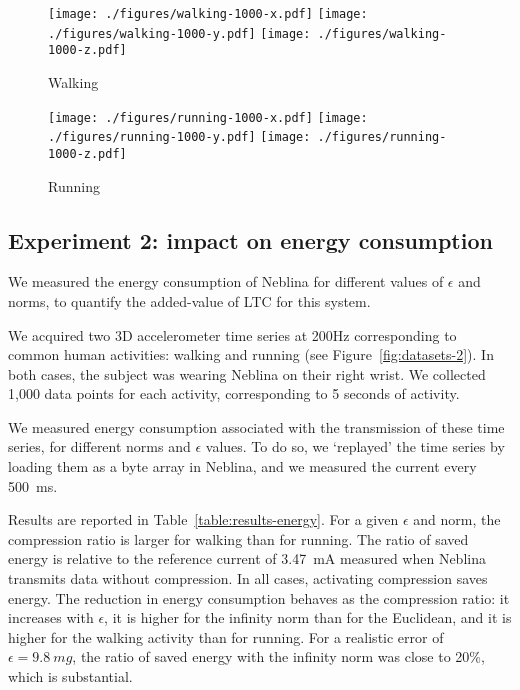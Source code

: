 \documentclass[10pt, conference, compsocconf]{IEEEtran}
\newcommand{\todo}[1]{\marginpar{\parbox{18mm}{\flushleft\tiny\color{red}\textbf{TODO}:
      #1}}}
\begin{document}
\begin{figure*}
\begin{subfigure}{2\columnwidth}
\texttt{[image: ./figures/walking-1000-x.pdf]}
\texttt{[image: ./figures/walking-1000-y.pdf]}
\texttt{[image: ./figures/walking-1000-z.pdf]}
\caption{Walking}
\end{subfigure}
\begin{subfigure}{2\columnwidth}
\texttt{[image: ./figures/running-1000-x.pdf]}
\texttt{[image: ./figures/running-1000-y.pdf]}
\texttt{[image: ./figures/running-1000-z.pdf]}
\caption{Running}
\end{subfigure}
\caption{Time series used in Experiment 2}
\label{fig:datasets-2}
\end{figure*}
\subsection{Experiment 2: impact on energy consumption}

We measured the energy consumption of Neblina
for different values of $\epsilon$ and norms, to quantify the
added-value of LTC for this system.

We acquired two 3D accelerometer time series at 200Hz corresponding to
common human activities: walking and running (see Figure~\ref{fig:datasets-2}). In both cases, the
subject was wearing Neblina on their right wrist.
We collected 1,000 data points for each activity, corresponding to
5 seconds of activity.

We measured energy consumption associated with the transmission of
these time series, for different norms and $\epsilon$ values. To do so,
we `replayed' the time series by loading them as a byte array in
Neblina, and we measured the current every 500~ms.

 Results are reported in Table~\ref{table:results-energy}. For a given
 $\epsilon$ and norm, the compression ratio is larger for walking than
 for running. The ratio of saved energy is relative to the reference
 current of 3.47~mA measured when Neblina transmits data without
 compression. In all cases, activating compression saves energy. The
 reduction in energy consumption behaves as the compression ratio: it
 increases with $\epsilon$,
it is higher for the infinity norm than for the Euclidean, and it is
higher for the walking activity than for running. For a realistic error
of $\epsilon=9.8~mg$\todo{unit}, the ratio of saved energy with the infinity norm was
close to 20\%, which is substantial.
\end{document}
